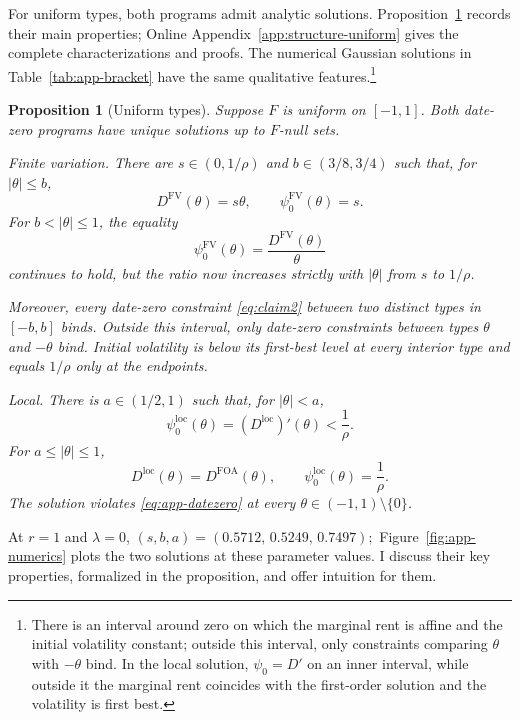 \documentclass[12pt]{article}
\newtheorem{prop}{Proposition}
\begin{document}
For uniform types, both programs admit analytic solutions.
Proposition~\ref{prop:app-uniform-programs} records their main
properties; Online Appendix~\ref{app:structure-uniform} gives the complete
characterizations and proofs. The numerical Gaussian solutions in
Table~\ref{tab:app-bracket} have the same qualitative features.\footnote{There is an interval around zero on which the marginal rent is affine and
the initial volatility constant; outside this interval, only
constraints comparing \(\theta\) with \(-\theta\) bind. In the local
solution, \(\psi_0=D'\) on an inner interval, while outside it the
marginal rent coincides with the first-order solution and the volatility is
first best.}

\begin{prop}[Uniform types]\label{prop:app-uniform-programs}
Suppose \(F\) is uniform on \([-1,1]\). Both date-zero programs have
unique solutions up to \(F\)-null sets. 

\emph{Finite variation.}
There are \(s\in(0,1/\rho)\) and \(b\in(3/8,3/4)\) such that, for
\(|\theta|\leq b\),
\[
  D^{\mathrm{FV}}(\theta)=s\theta,
  \qquad
  \psi_0^{\mathrm{FV}}(\theta)=s.
\]
For \(b<|\theta|\leq1\), the equality
\[
  \psi_0^{\mathrm{FV}}(\theta)
  =
  \frac{D^{\mathrm{FV}}(\theta)}{\theta}
\]
continues to hold, but the ratio now increases strictly with
\(|\theta|\) from \(s\) to \(1/\rho\).

Moreover, every date-zero constraint \eqref{eq:claim2} between two distinct types in
\([-b,b]\) binds. Outside this interval, only date-zero constraints
between types \(\theta\) and \(-\theta\) bind. Initial volatility is
below its first-best level at every interior type and equals
\(1/\rho\) only at the endpoints.

\emph{Local.}
There is \(a\in(1/2,1)\) such that, for \(|\theta|<a\),
\[
  \psi_0^{\mathrm{loc}}(\theta)
  =
  (D^{\mathrm{loc}})'(\theta)
  <
  \frac1\rho.
\]
For \(a\leq|\theta|\leq1\),
\[
  D^{\mathrm{loc}}(\theta)
  =
  D^{\mathrm{FOA}}(\theta),
  \qquad
  \psi_0^{\mathrm{loc}}(\theta)
  =
  \frac1\rho.
\]
The solution violates
\eqref{eq:app-datezero} at every
\(\theta\in(-1,1)\setminus\{0\}\).
\end{prop}

At \(r=1\) and \(\lambda=0\),
\(
  (s,b,a)=(0.5712,\,0.5249,\,0.7497);
\)
Figure~\ref{fig:app-numerics} plots the two solutions at these
parameter values. I discuss their key properties, formalized in the proposition, and offer intuition for them. 
\end{document}
